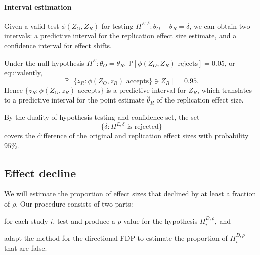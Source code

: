 \documentclass[aoas, preprint]{imsart}
\theoremstyle{definition}
\theoremstyle{custom}
\newcommand{\PP}{\mathbb{P}}
\newcommand{\htheta}{\hat{\theta}}
\begin{document}
  \paragraph{Interval estimation} Given a valid test $\phi(Z_O, Z_R)$ for testing $H^{E,\delta}: \theta_O - \theta_R = \delta$, we can obtain two intervals: a predictive interval for the replication effect size estimate, and a confidence interval for effect shifts.

  Under the null hypothesis $H^E: \theta_O = \theta_R$, $\PP[\phi(Z_O, Z_R) \text{ rejects}] = 0.05$, or equivalently,
  \[
    \PP[\{z_R: \phi(Z_O, z_R) \text{ accepts}\} \ni Z_R] = 0.95.
  \]
  Hence $\{z_R: \phi(Z_O, z_R) \text{ accepts}\}$ is a predictive interval for $Z_R$, which translates to a predictive interval for the point estimate $\htheta_R$ of the replication effect size.

  By the duality of hypothesis testing and confidence set, the set
  \[
    \{\delta: H^{E,\delta} \text{ is rejected}\}
  \]
  covers the difference of the original and replication effect sizes with probability $95\%$.

\subsection{Effect decline}

  We will estimate the proportion of effect sizes that declined by at least a fraction of $\rho$. Our procedure consists of two parts:
  \begin{inlinelist}
    \item for each study $i$, test and produce a $p$-value for the hypothesis $H_i^{D,\rho}$, and
    \item adapt the method for the directional FDP to estimate the proportion of $H_i^{D,\rho}$ that are false.
  \end{inlinelist}
\end{document}
